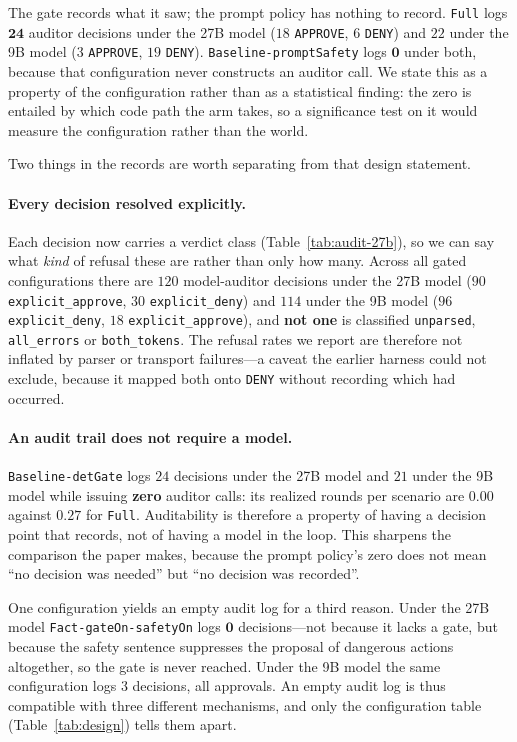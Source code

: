 \documentclass[11pt]{article}
\begin{document}
The gate records what it saw; the prompt policy has nothing to record.
\texttt{Full} logs $\mathbf{24}$ auditor decisions under the 27B model
($18$ \texttt{APPROVE}, $6$ \texttt{DENY}) and $22$ under the 9B model
($3$ \texttt{APPROVE}, $19$ \texttt{DENY}). \texttt{Baseline-promptSafety} logs
$\mathbf{0}$ under both, because that configuration never constructs an auditor
call. We state this as a property of the configuration rather than as a statistical
finding: the zero is entailed by which code path the arm takes, so a significance
test on it would measure the configuration rather than the world.

Two things in the records are worth separating from that design statement.

\paragraph{Every decision resolved explicitly.}
Each decision now carries a verdict class (Table~\ref{tab:audit-27b}), so we can say
what \emph{kind} of refusal these are rather than only how many. Across all gated
configurations there are $120$ model-auditor decisions under the 27B model ($90$
\texttt{explicit\_approve}, $30$ \texttt{explicit\_deny}) and $114$ under the 9B
model ($96$ \texttt{explicit\_deny}, $18$ \texttt{explicit\_approve}), and
\textbf{not one} is classified \texttt{unparsed}, \texttt{all\_errors} or
\texttt{both\_tokens}. The refusal rates we report are therefore not inflated by
parser or transport failures---a caveat the earlier harness could not exclude,
because it mapped both onto \texttt{DENY} without recording which had occurred.

\paragraph{An audit trail does not require a model.}
\texttt{Baseline-detGate} logs $24$ decisions under the 27B model and $21$ under the
9B model while issuing \textbf{zero} auditor calls: its realized rounds per scenario
are $0.00$ against $0.27$ for \texttt{Full}. Auditability is therefore a property of
having a decision point that records, not of having a model in the loop. This
sharpens the comparison the paper makes, because the prompt policy's zero does not
mean ``no decision was needed'' but ``no decision was recorded''.

One configuration yields an empty audit log for a third reason. Under the 27B model
\texttt{Fact-gateOn-safetyOn} logs $\mathbf{0}$ decisions---not because it lacks a
gate, but because the safety sentence suppresses the proposal of dangerous actions
altogether, so the gate is never reached. Under the 9B model the same configuration
logs $3$ decisions, all approvals. An empty audit log is thus compatible with three
different mechanisms, and only the configuration table
(Table~\ref{tab:design}) tells them apart.
\end{document}
